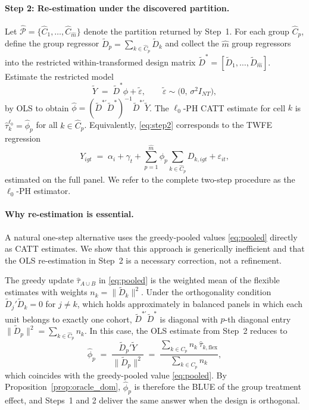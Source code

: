 \documentclass[margin=5in, 12pt]{article}
\newcommand{\1}{\mathbbm{1}}
\begin{document}
  \paragraph{Step 2: Re-estimation under the discovered partition.} Let $\hat{\mathcal{P}} = \{\hat{C}_1, \ldots,
  \hat{C}_{\hat{m}}\}$ denote the partition returned by Step~1. For each group $\hat{C}_p$, define the group regressor
  $\tilde{D}_p = \sum_{k \in \hat{C}_p} \tilde{D}_k$ and collect the $\hat{m}$ group regressors into the restricted
  within-transformed design matrix $\tilde{D}^* = [\tilde{D}_1, \ldots, \tilde{D}_{\hat{m}}]$. Estimate the restricted model
  \begin{equation}
    \tilde{Y} \;=\; \tilde{D}^*\phi + \tilde{\varepsilon}, \qquad \tilde{\varepsilon} \sim \bigl(0,\, \sigma^2 I_{NT}\bigr),
    \label{eq:step2}
  \end{equation}
  by OLS to obtain $\hat{\phi} = (\tilde{D}^{*\prime}\tilde{D}^*)^{-1}\tilde{D}^{*\prime}\tilde{Y}$. The $\ell_0$-PH CATT estimate
  for cell $k$ is $\hat{\tau}_k^{\ell_0} = \hat{\phi}_p$ for all $k \in \hat{C}_p$. Equivalently, \eqref{eq:step2} corresponds to
   the TWFE regression
  \begin{equation}
    Y_{igt} \;=\; \alpha_i + \gamma_t + \sum_{p=1}^{\hat{m}} \phi_p \sum_{k \in \hat{C}_p} D_{k,igt} + \varepsilon_{it},
    \label{eq:step2twfe}
  \end{equation}
  estimated on the full panel. We refer to the complete two-step procedure as the $\ell_0$-PH estimator.

  \paragraph{Why re-estimation is essential.} A natural one-step alternative uses the greedy-pooled values \eqref{eq:pooled}
  directly as CATT estimates. We show that this approach is generically inefficient and that the OLS re-estimation in Step~2 is a
   necessary correction, not a refinement.

  The greedy update $\hat{\tau}_{A \cup B}$ in \eqref{eq:pooled} is the weighted mean of the flexible estimates with weights $n_k
   = \|\tilde{D}_k\|^2$. Under the orthogonality condition $\tilde{D}_j'\tilde{D}_k = 0$ for $j \neq k$, which holds approximately in
  balanced panels in which each unit belongs to exactly one cohort, $\tilde{D}^{*\prime}\tilde{D}^*$ is diagonal with $p$-th
  diagonal entry $\|\tilde{D}_p\|^2 = \sum_{k \in \hat{C}_p} n_k$. In this case, the OLS estimate from Step~2 reduces to
  \begin{equation}
    \hat{\phi}_p \;=\; \frac{\tilde{D}_p'\tilde{Y}}{\|\tilde{D}_p\|^2} \;=\; \frac{\displaystyle\sum_{k \in \hat{C}_p}
  n_k\,\hat{\tau}_{k,\mathrm{flex}}}{\displaystyle\sum_{k \in \hat{C}_p} n_k},
    \label{eq:phorthog}
  \end{equation}
  which coincides with the greedy-pooled value \eqref{eq:pooled}. By Proposition~\ref{prop:oracle_dom}, $\hat{\phi}_p$ is therefore the BLUE of the
  group treatment effect, and Steps~1 and 2 deliver the same answer when the design is orthogonal.
\end{document}
